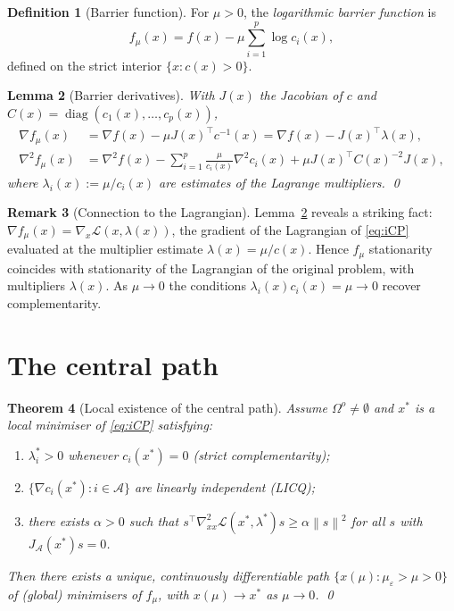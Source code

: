 \documentclass[11pt,a4paper]{report}
\theoremstyle{plain}
\newtheorem{theorem}{Theorem}[chapter]
\newtheorem{lemma}[theorem]{Lemma}
\theoremstyle{definition}
\newtheorem{definition}[theorem]{Definition}
\newtheorem{remark}[theorem]{Remark}
\newcommand{\norm}[1]{\left\lVert#1\right\rVert}
\newcommand{\grad}{\nabla}
\newcommand{\hess}{\nabla^{2}}
\DeclareMathOperator{\diag}{diag}
\newcommand{\trans}{^{\top}}
\newcommand{\eps}{\varepsilon}
\begin{document}
\begin{definition}[Barrier function]
For $\mu>0$, the \emph{logarithmic barrier function} is
\begin{equation}\label{eq:barrier}
f_{\mu}(x)=f(x)-\mu\sum_{i=1}^{p}\log c_{i}(x),
\end{equation}
defined on the strict interior $\{x:c(x)>0\}$.
\end{definition}

\begin{lemma}[Barrier derivatives]\label{lem:barrier-deriv}
With $J(x)$ the Jacobian of $c$ and $C(x)=\diag(c_{1}(x),\dots,c_{p}(x))$,
\begin{align*}
\grad f_{\mu}(x)&=\grad f(x)-\mu J(x)\trans c^{-1}(x)
=\grad f(x)-J(x)\trans \lambda(x),\\
\hess f_{\mu}(x)&=\hess f(x)-\sum_{i=1}^{p}\frac{\mu}{c_{i}(x)}\hess c_{i}(x)
+\mu J(x)\trans C(x)^{-2}J(x),
\end{align*}
where $\lambda_{i}(x):=\mu/c_{i}(x)$ are estimates of the Lagrange multipliers. \qed
\end{lemma}

\begin{remark}[Connection to the Lagrangian]
Lemma~\ref{lem:barrier-deriv} reveals a striking fact: $\grad f_{\mu}(x)=
\grad_{x}\mathcal{L}(x,\lambda(x))$, the gradient of the Lagrangian of
\eqref{eq:iCP} evaluated at the multiplier estimate $\lambda(x)=\mu/c(x)$.
Hence $f_{\mu}$ stationarity coincides with stationarity of the Lagrangian of
the original problem, with multipliers $\lambda(x)$. As $\mu\to 0$ the conditions
$\lambda_{i}(x)c_{i}(x)=\mu\to 0$ recover complementarity.
\end{remark}

\section{The central path}

\begin{theorem}[Local existence of the central path]\label{thm:central-path}
Assume $\Omega^{o}\ne\emptyset$ and $x^{*}$ is a local minimiser of \eqref{eq:iCP}
satisfying:
\begin{enumerate}[leftmargin=2em,itemsep=0pt]
  \item $\lambda^{*}_{i}>0$ whenever $c_{i}(x^{*})=0$ \emph{(strict
        complementarity)};
  \item $\{\grad c_{i}(x^{*}):i\in\mathcal{A}\}$ are linearly independent (LICQ);
  \item there exists $\alpha>0$ such that $s\trans\hess_{xx}\mathcal{L}(x^{*},\lambda^{*})s
        \ge\alpha\norm{s}^{2}$ for all $s$ with $J_{\mathcal{A}}(x^{*})s=0$.
\end{enumerate}
Then there exists a unique, continuously differentiable path
$\{x(\mu):\mu_{\eps}>\mu>0\}$ of (global) minimisers of $f_{\mu}$, with
$x(\mu)\to x^{*}$ as $\mu\to 0$. \qed
\end{theorem}
\end{document}

